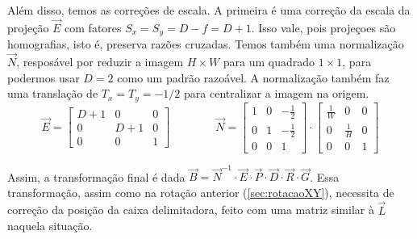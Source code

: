     Além disso, temos as correções de escala. A primeira é uma correção da escala da projeção $\vec{E}$ com fatores $S_x = S_y = D - f = D + 1$. Isso vale, pois projeçoes são homografias, isto é, preserva razões cruzadas. Temos também uma normalização $\vec{N}$, resposável por reduzir a imagem $H \times W$ para um quadrado $1 \times 1$, para podermos usar $D = 2$ como um padrão razoável. A normalização também faz uma translação de $T_x = T_y = -1/2$ para centralizar a imagem na origem.
    \[
        \vec{E} = \begin{bmatrix}
            D + 1 & 0 & 0 \\
            0 & D + 1 & 0 \\
            0 & 0 & 1
        \end{bmatrix}
        \qquad \qquad
        \vec{N} = \begin{bmatrix}
            1 & 0 & -\frac{1}{2} \\
            0 & 1 & -\frac{1}{2} \\
            0 & 0 & 1
        \end{bmatrix} \cdot \begin{bmatrix}
            \frac{1}{W} & 0 & 0 \\
            0 & \frac{1}{H} & 0 \\
            0 & 0 & 1
        \end{bmatrix}
    \]

    Assim, a transformação final é dada $\vec{B} = \vec{N}^{-1} \cdot \vec{E} \cdot \vec{P} \cdot \vec{D} \cdot \vec{R} \cdot \vec{G}$. Essa transformação, assim como na rotação anterior (\cref{sec:rotacaoXY}), necessita de correção da posição da caixa delimitadora, feito com uma matriz similar à $\vec{L}$ naquela situação.

